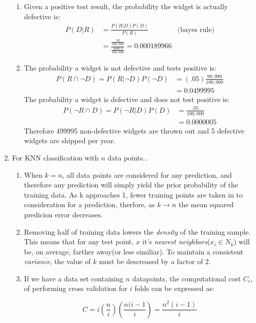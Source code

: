 \documentclass{report}
\begin{document}
\begin{enumerate}
	     
	    \begin{enumerate}[label=(\alph*)]
		\item Given a positive test result, the probability the widget is actually defective is:
	 	\begin{align*}
	 	 P(D \vert R)	&= \frac{P(R \vert D)P(D)}{P(R)} & \text{(bayes rule)} \\
	 	 				&= \frac{\frac{.95}{100,000}}{\frac{5000.9}{100,000}}
	 	 				 = \mathbf{0.000189966}
	    \end{align*}
		\item The probability a widget is not defective and tests positive is:
		\begin{align*}
		P(R \cap \lnot D) = P(R \vert \lnot D)P(\lnot D) 	&= (.05)\frac{99,999}{100,000} \\
															&= 0.0499995
		\end{align*}
		The probability a widget is defective and does not test positive is:
		\begin{align*}
		P(\lnot R \cap D) = P(\lnot R \vert  D)P(D) 	&= \frac{.05}{100,000} \\
														&= 0.0000005
		\end{align*}
		Therefore 499995 non-defective widgets are thrown out and 5 defective widgets are shipped per year.
		\end{enumerate}
		\item For KNN classification with $n$ data points...
		\begin{enumerate}
			\item When $k = n$, all data points are considered for any prediction, and therefore any prediction will simply yield the prior probability of the training data. As k approaches 1, fewer training points are taken in to consideration for a prediction, therfore, as $k \rightarrow n$ the mean squared predicion error decreases.
			\item  Removing half of training data lowers the \textit{density} of the training sample. This means that for any test point, $x$ it's \textit{nearest neighbors}($x_i \in N_k$) will be, on average, farther away(or less similiar). To maintain a consistent \textit{variance}, the value of $k$ must be descreased by a factor of $2$. 
			
			\item If we have a data set containing $n$ datapoints, the computational cost $C_i$, of performing cross validation for $i$ folds can be expressed as:
			
			\begin{equation*}
			 C = i \left( \frac{n}{i} \right)\left( \frac{n(i-1}{i} \right) =  \frac{n^2(i-1)}{i}
			\end{equation*}
			

\end{enumerate}
\end{enumerate}
\end{document}

